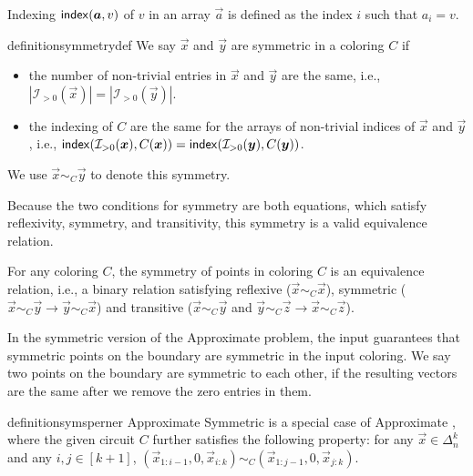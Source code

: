 \begin{definition}
    \label{def:indexing}
    Indexing $\mathsf{index}(\boldsymbol{a}, v)$ of $v$ in an array $\vec{a}$ is defined as the index $i$ such that $a_i=v$. 
\end{definition}

\begin{restatable}{definition}{symmetrydef}
    \label{def:symmetry-in-coloring}
    We say $\vec{x}$ and $\vec{y}$ are symmetric in a coloring $C$ if 
    \begin{itemize}[topsep=0.5em, itemsep=0.1em]
        \item the number of non-trivial entries in $\vec{x}$ and $\vec{y}$ are the same, i.e., $|\mathcal{I}_{>0}(\vec{x})| = |\mathcal{I}_{>0}(\vec{y})|$.
        \item the indexing of $C$ are the same for the arrays of non-trivial indices of $\vec{x}$ and $\vec{y}$, i.e., $\mathsf{index}(\mathcal{I}_{>0}(\boldsymbol{x}), C(\boldsymbol{x})) = \mathsf{index}(\mathcal{I}_{>0}(\boldsymbol{y}), C(\boldsymbol{y}))$.
    \end{itemize}
    We use $\vec{x}\sim_C \vec{y}$ to denote this symmetry. 
\end{restatable}

Because the two conditions for symmetry are both equations, which satisfy reflexivity, symmetry, and transitivity, this symmetry is a valid equivalence relation. 
\begin{fact}
    \label{lem:symmetry-is-equiv-relation}
    For any coloring $C$, the symmetry of points in coloring $C$ is an equivalence relation, i.e., a binary relation satisfying reflexive ($\vec{x}\sim_{C} \vec{x}$), symmetric ($\vec{x}\sim_{C} \vec{y} \rightarrow \vec{y}\sim_{C} \vec{x}$) and transitive ($\vec{x}\sim_{C} \vec{y}$ and $\vec{y}\sim_{C} \vec{z} \rightarrow \vec{x}\sim_{C} \vec{z}$).
\end{fact}

In the symmetric version of the \outofk Approximate \Sperner problem, the input guarantees that symmetric points on the boundary are symmetric in the input coloring. 
We say two points on the boundary are symmetric to each other, if the resulting vectors are the same after we remove the zero entries in them.
\begin{restatable}{definition}{symsperner}
    \label{def:approx-symmetric-kd-sperner}
    \outofk Approximate Symmetric \Sperner is a special case of \outofk Approximate \Sperner, where the given circuit $C$ further satisfies the following property: for any $\vec{x}\in \Delta_n^{k}$ and any $i,j \in [k+1]$, $(\vec{x}_{1:i-1}, 0, \vec{x}_{i:k}) \sim_C (\vec{x}_{1:j-1},0, \vec{x}_{j:k})$. 
\end{restatable}


